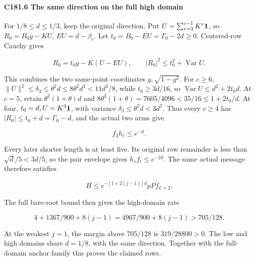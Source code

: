 \paragraph{C181.6 The same direction on the full high domain}

For \(1/8\le d\le1/3\), keep the original direction. Put \(U=\sum_{r=3}^{c-1}K^r\mathbf1\), so \(R_0=B_0g-KU\), \(EU=d-\beta_c\). Let \(t_0=B_0-EU=\Gamma_0-2d\ge0\). Centered-row Cauchy gives

\[
R_0=t_0g-K(U-EU),\qquad |R_0|^2\le t_0^2+\operatorname{\operatorname{Var}}U.
\tag{C181.T190.30}
\]

This combines the two same-point coordinates \(g,\allowbreak \allowbreak  \sqrt{1-g^2}\). For \(c\ge6\), \(\|U\|^2\le \delta_3\le\theta^2d\le8\theta^2d^2<11d^2/8\), while \(t_0\ge3d/16\), so \(\operatorname{\operatorname{Var}}U\le d^2+2t_0d\). At \(c=5\), retain \(\theta^2(1+\theta)d\) and \(8\theta^2(1+\theta)=7605/4096<35/16\le1+2t_0/d\). At four, \(t_0=d,\allowbreak \allowbreak  U=K^3\mathbf1\), with variance \(\delta_3\le\theta^2d<3d^2\). Thus every \(c\ge4\) has \(|R_0|\le t_0+d=\Gamma_0-d\), and the actual two arms give

\[
f_3h_c\le e^{-d}.\label{eq:C181:d}
\tag{C181.T190.31}
\]

Every later shorter length is at least five. Its original row remainder is less than \(\sqrt d/5<3d/5\), so the pair envelope gives \(h_sf_t\le e^{-2d}\). The same actual message therefore satisfies

\[
H\le e^{-[1+2(j-1)]d}pP \bar f_{L+2}.
\]

The full bare-root bound then gives the high-domain rate

\[
4+1367/900+8(j-1)=4967/900+8(j-1)>705/128.
\tag{C181.T190.32}
\]

At the weakest \(j=1\), the margin above \(705/128\) is \(319/28800>0\). The low and high domains share \(d=1/8\), with the same direction. Together with the full-domain anchor family this proves the claimed rows.
